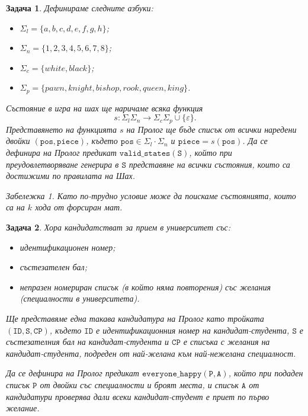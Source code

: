 \documentclass[12pt]{article}
\newtheorem{problem}{Задача}
\theoremstyle{definition}
\theoremstyle{remark}
\newtheorem*{remark}{Забележка}
\begin{document}
\begin{problem}
  Дефинираме следните азбуки:
  \begin{itemize}
    \item $\Sigma_{l} = \{ a, b, c, d, e, f, g, h \}$;
    \item $\Sigma_{n} = \{ 1, 2, 3, 4, 5, 6, 7, 8 \}$;
    \item $\Sigma_{c} = \{ white, black \}$;
    \item $\Sigma_{p} = \{ pawn, knight, bishop, rook, queen, king \}$.
  \end{itemize}
  Състояние в игра на шах ще наричаме всяка функция
  \[
    s : \Sigma_{l} \Sigma_{n} \rightarrow \Sigma_{c} \Sigma_{p} \cup \{ \varepsilon \}.
  \]
  Представянето на функцията $s$ на Пролог ще бъде списък от всички наредени двойки $\mathtt{(pos, piece)}$, където $\mathtt{pos} \in \Sigma_l \cdot \Sigma_n$ и $\mathtt{piece} = s(\mathtt{pos})$.
  Да се дефинира на Пролог предикат $\mathtt{valid\_states(S)}$, който при преудовлетворяване генерира в $\mathtt{S}$ представяне на всички състояния, които са достижими по правилата на Шах.
  \begin{remark}
    Като по-трудно условие може да поискаме състоянията, които са на $k$ хода от форсиран мат.
  \end{remark}
\end{problem}

\begin{problem}
  Хора кандидатстват за прием в университет със:
  \begin{itemize}
    \item идентификационен номер;
    \item състезателен бал;
    \item непразен номериран списък (в който няма повторения) със желания (специалности в университета).
  \end{itemize}
  Ще представяме една такава кандидатура на Пролог като тройката $\mathtt{(ID, S, CP)}$, където $\mathtt{ID}$ е идентификационния номер на кандидат-студента, $\mathtt{S}$ е състезателния бал на кандидат-студента и $\mathtt{CP}$ е списъка с желания на кандидат-студента, подреден от най-желана към най-нежелана специалност.

  Да се дефинира на Пролог предикат $\mathtt{everyone\_happy(P, A)}$, който при подаден списък $\mathtt{P}$ от двойки със специалности и броят места, и списък $\mathtt{A}$ от кандидатури проверява дали всеки кандидат-студент е приет по първо желание.
\end{problem}
\end{document}
